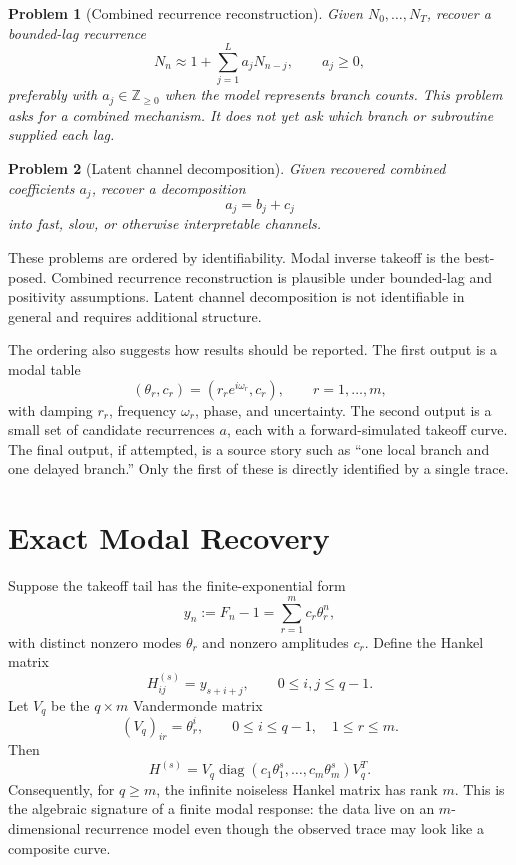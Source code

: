 \documentclass[10pt,twocolumn]{article}
\newtheorem{problem}{Problem}
\newcommand{\ZZ}{\mathbb{Z}}
\begin{document}
\begin{problem}[Combined recurrence reconstruction]
Given \(N_0,\ldots,N_T\), recover a bounded-lag recurrence
\[
        N_n
        \approx
        1+\sum_{j=1}^{L}a_jN_{n-j},
        \qquad
        a_j\ge 0,
\]
preferably with \(a_j\in\ZZ_{\ge0}\) when the model represents branch counts.
This problem asks for a combined mechanism. It does not yet ask which branch or
subroutine supplied each lag.
\end{problem}

\begin{problem}[Latent channel decomposition]
Given recovered combined coefficients \(a_j\), recover a decomposition
\[
        a_j=b_j+c_j
\]
into fast, slow, or otherwise interpretable channels.
\end{problem}

These problems are ordered by identifiability. Modal inverse takeoff is the
best-posed. Combined recurrence reconstruction is plausible under bounded-lag
and positivity assumptions. Latent channel decomposition is not identifiable in
general and requires additional structure.

The ordering also suggests how results should be reported. The first output is
a modal table
\[
        (\theta_r,c_r)
        =
        (r_re^{i\omega_r},c_r),
        \qquad r=1,\ldots,m,
\]
with damping \(r_r\), frequency \(\omega_r\), phase, and uncertainty. The
second output is a small set of candidate recurrences \(a\), each with a
forward-simulated takeoff curve. The final output, if attempted, is a source
story such as ``one local branch and one delayed branch.'' Only the first of
these is directly identified by a single trace.

\section{Exact Modal Recovery}

Suppose the takeoff tail has the finite-exponential form
\[
        y_n:=F_n-1=\sum_{r=1}^{m}c_r\theta_r^n,
\]
with distinct nonzero modes \(\theta_r\) and nonzero amplitudes \(c_r\).
Define the Hankel matrix
\[
        H^{(s)}_{ij}=y_{s+i+j},
        \qquad 0\le i,j\le q-1.
\]
Let \(V_q\) be the \(q\times m\) Vandermonde matrix
\[
        (V_q)_{ir}=\theta_r^i,
        \qquad 0\le i\le q-1,\quad 1\le r\le m.
\]
Then
\[
        H^{(s)}
        =
        V_q
        \operatorname{diag}(c_1\theta_1^s,\ldots,c_m\theta_m^s)
        V_q^{T}.
\]
Consequently, for \(q\ge m\), the infinite noiseless Hankel matrix has rank
\(m\). This is the algebraic signature of a finite modal response: the data
live on an \(m\)-dimensional recurrence model even though the observed trace may
look like a composite curve.
\end{document}
